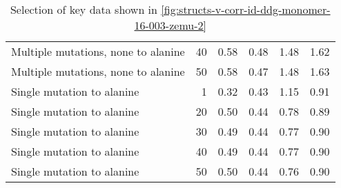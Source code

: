 \begin{table}
\begin{tabular}{lrrrrr}
 Multiple mutations, none to alanine &          40 &             0.58 &                    0.48 &               1.48 &                      1.62 \\
 Multiple mutations, none to alanine &          50 &             0.58 &                    0.47 &               1.48 &                      1.63 \\
          Single mutation to alanine &           1 &             0.32 &                    0.43 &               1.15 &                      0.91 \\
          Single mutation to alanine &          20 &             0.50 &                    0.44 &               0.78 &                      0.89 \\
          Single mutation to alanine &          30 &             0.49 &                    0.44 &               0.77 &                      0.90 \\
          Single mutation to alanine &          40 &             0.49 &                    0.44 &               0.77 &                      0.90 \\
          Single mutation to alanine &          50 &             0.50 &                    0.44 &               0.76 &                      0.90 \\
\bottomrule
\end{tabular}

\caption[]{Selection of key data shown in \cref{fig:structs-v-corr-id-ddg-monomer-16-003-zemu-2}}
\label{tab:structs-v-corr-id-ddg-monomer-16-003-zemu-2-underlying-data}
\end{table}
